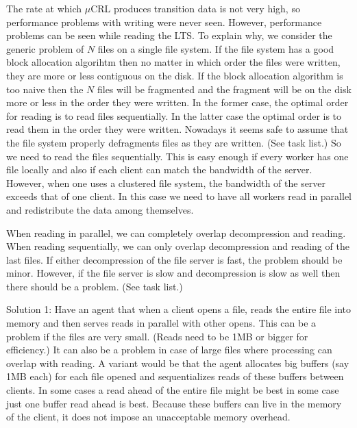 \documentclass{article}
\begin{document}
The rate at which $\mu$CRL produces transition data is not very high,
so performance problems with writing were never seen. However, performance problems
can be seen while reading the LTS. To explain why, we consider the generic problem
of $N$ files on a single file system. If the file system has a good block
allocation algorihtm then no matter in which order the files were written,
they are more or less contiguous on the disk. If the block allocation algorithm is
too naive then the $N$ files will be fragmented and the fragment will be on
the disk more or less in the order they were written. In the former case, the optimal order
for reading is to read files sequentially. In the latter case the optimal order is
to read them in the order they were written. Nowadays it seems safe to assume that
the file system properly defragments files as they are written. (See task list.)
So we need to read the files sequentially. This is easy enough if every worker has one file locally
and also if each client can match the bandwidth of the server. However, when one uses
a clustered file system, the bandwidth of the server exceeds that of one client.
In this case we need to have all workers read in parallel and redistribute the data
among themselves.

When reading in parallel, we can completely overlap decompression and 
reading. When reading sequentially, we can only overlap decompression and
reading of the last files. If either decompression of the file server is fast,
the problem should be minor. However, if the file server is slow and
decompression is slow as well then there should be a problem. (See task list.)

Solution 1: Have an agent that when a client opens a file, reads the entire file
into memory and then serves reads in parallel with other opens. This can be a
problem if the files are very small. (Reads need to be 1MB or bigger for efficiency.)
It can also be a problem in case of large files where processing can overlap with
reading. A variant would be that the agent allocates big buffers (say 1MB each) for
each file opened and sequentializes reads of these buffers between clients.
In some cases a read ahead of the entire file might be best in some case just one
buffer read ahead is best. Because these buffers can live in the
memory of the client, it does not impose an unacceptable memory overhead.
\end{document}
